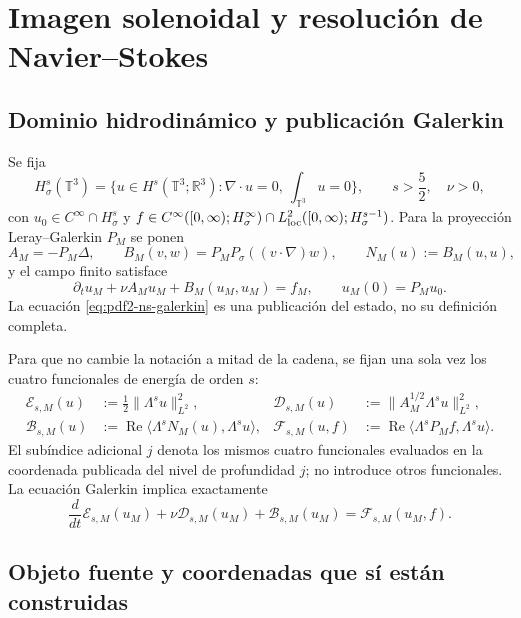 \chapter{Imagen solenoidal y resolución de Navier--Stokes}

\section{Dominio hidrodinámico y publicación Galerkin}

Se fija
\[
 H^s_\sigma(\mathbb T^3)=
 \{u\in H^s(\mathbb T^3;\mathbb R^3):
   \nabla\!\cdot u=0,\ \int_{\mathbb T^3}u=0\},
 \qquad s>\frac52,\quad\nu>0,
\]
con
$u_0\in C^\infty\cap H^s_\sigma$ y
$f\in C^\infty([0,\infty);H^\infty_\sigma)
\cap L^2_{\rm loc}([0,\infty);H^{s-1}_\sigma)$. Para la proyección
Leray--Galerkin $P_M$ se ponen
\[
 A_M=-P_M\Delta,
 \qquad B_M(v,w)=P_MP_\sigma((v\cdot\nabla)w),
 \qquad N_M(u):=B_M(u,u),
\]
y el campo finito satisface
\begin{equation}\label{eq:pdf2-ns-galerkin}
 \partial_tu_M+\nu A_Mu_M+B_M(u_M,u_M)=f_M,
 \qquad u_M(0)=P_Mu_0.
\end{equation}
La ecuación \eqref{eq:pdf2-ns-galerkin} es una publicación del estado, no su
definición completa.

Para que no cambie la notación a mitad de la cadena, se fijan una sola vez los
cuatro funcionales de energía de orden $s$:
\begin{equation}\label{eq:pdf2-ns-energy-functionals}
 \begin{aligned}
 \mathscr E_{s,M}(u)&:=\frac12\|\Lambda^su\|_{L^2}^2,
 &\mathscr D_{s,M}(u)&:=\|A_M^{1/2}\Lambda^su\|_{L^2}^2,\\
 \mathscr B_{s,M}(u)&:=
   \operatorname{Re}\langle\Lambda^sN_M(u),\Lambda^su\rangle,
 &\mathscr F_{s,M}(u,f)&:=
   \operatorname{Re}\langle\Lambda^sP_Mf,\Lambda^su\rangle.
 \end{aligned}
\end{equation}
El subíndice adicional $j$ denota los mismos cuatro funcionales evaluados en
la coordenada publicada del nivel de profundidad $j$; no introduce otros
funcionales.
La ecuación Galerkin implica exactamente
\begin{equation}\label{eq:pdf2-ns-energy-identity}
 \frac d{dt}\mathscr E_{s,M}(u_M)
 +\nu\mathscr D_{s,M}(u_M)+\mathscr B_{s,M}(u_M)
 =\mathscr F_{s,M}(u_M,f).
\end{equation}

\section{Objeto fuente y coordenadas que sí están construidas}

